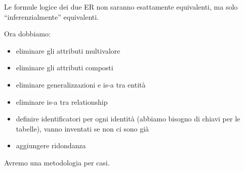 Le formule logice dei due ER non saranno esattamente equivalenti, ma solo ``inferenzialmente'' equivalenti.

Ora dobbiamo:
\begin{itemize}
    \item eliminare gli attributi multivalore
    \item eliminare gli attributi composti
    \item eliminare generalizzazioni e is-a tra entit\`a
    \item eliminare is-a tra relationship
    \item definire identificatori per ogni identit\`a (abbiamo bisogno di chiavi per le tabelle), vanno inventati se non ci sono gi\`a
    \item aggiungere ridondanza
\end{itemize}

Avremo una metodologia per casi.


